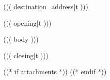 \documentclass{amivletter}
\begin{document}
\subject{((( subject|t )))}
\signature{((( signature|t )))}

\genericamivinfoblock

\begin{letter}{%
    ((( destination_address|t )))
}

\opening{((( opening|t )))}

((( body )))

\closing{((( closing|t )))}
((* if attachments *))
((* endif *))

\end{letter}
\end{document}
